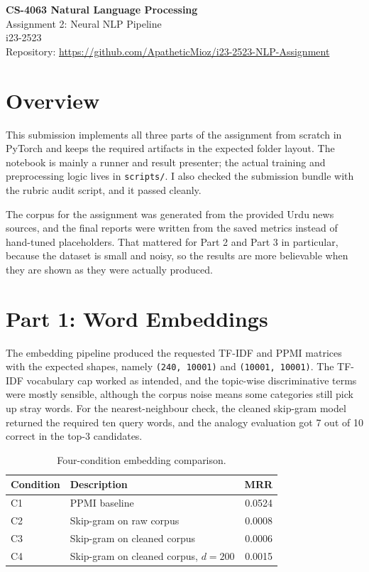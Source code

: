 \documentclass[12pt]{article}
\begin{document}
\begin{center}
{\Large \textbf{CS-4063 Natural Language Processing}}\\[0.25em]
{\large Assignment 2: Neural NLP Pipeline}\\[0.4em]
{i23-2523}\\[0.25em]
Repository: \url{https://github.com/ApatheticMioz/i23-2523-NLP-Assignment}
\end{center}

\section{Overview}
This submission implements all three parts of the assignment from scratch in PyTorch and keeps the required artifacts in the expected folder layout. The notebook is mainly a runner and result presenter; the actual training and preprocessing logic lives in \texttt{scripts/}. I also checked the submission bundle with the rubric audit script, and it passed cleanly.

The corpus for the assignment was generated from the provided Urdu news sources, and the final reports were written from the saved metrics instead of hand-tuned placeholders. That mattered for Part 2 and Part 3 in particular, because the dataset is small and noisy, so the results are more believable when they are shown as they were actually produced.

\section{Part 1: Word Embeddings}
The embedding pipeline produced the requested TF-IDF and PPMI matrices with the expected shapes, namely \texttt{(240, 10001)} and \texttt{(10001, 10001)}. The TF-IDF vocabulary cap worked as intended, and the topic-wise discriminative terms were mostly sensible, although the corpus noise means some categories still pick up stray words. For the nearest-neighbour check, the cleaned skip-gram model returned the required ten query words, and the analogy evaluation got 7 out of 10 correct in the top-3 candidates.

\begin{table}[h]
\centering
\small
\begin{tabularx}{\linewidth}{@{}lXr@{}}
\toprule
Condition & Description & MRR \\
\midrule
C1 & PPMI baseline & 0.0524 \\
C2 & Skip-gram on raw corpus & 0.0008 \\
C3 & Skip-gram on cleaned corpus & 0.0006 \\
C4 & Skip-gram on cleaned corpus, $d=200$ & 0.0015 \\
\bottomrule
\end{tabularx}
\caption{Four-condition embedding comparison.}
\end{table}
\end{document}
